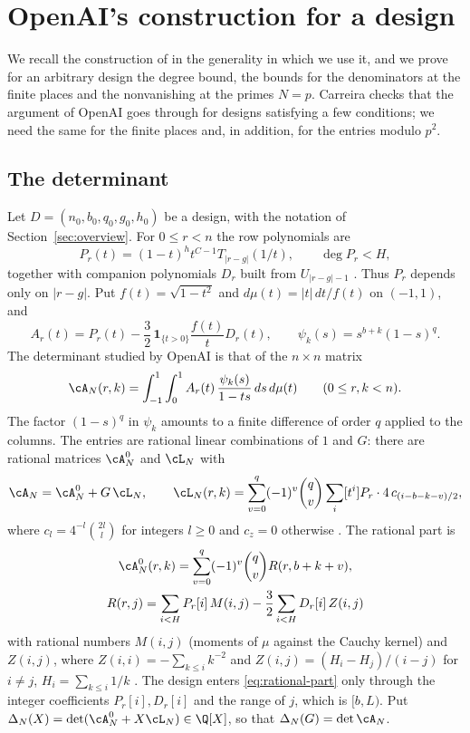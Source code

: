 \section{OpenAI's construction for a design}\label{sec:setup}

We recall the construction of \cite{OpenAI2026} in the generality in which we use it, and we prove for an
arbitrary design the degree bound, the bounds for the denominators at the finite places and the
nonvanishing at the primes $N=p$. Carreira \cite{Carreira2026} checks that the argument of OpenAI goes
through for designs satisfying a few conditions; we need the same for the finite places and, in addition,
for the entries modulo $p^2$.

\subsection{The determinant}
Let $D=(n_0,b_0,q_0,g_0,h_0)$ be a design, with the notation of Section~\ref{sec:overview}. For $0\le r<n$
the row polynomials are
\begin{equation}\label{eq:rows}
 P_r(t)=(1-t)^ht^{C-1}T_{|r-g|}(1/t),\qquad \deg P_r<H,
\end{equation}
together with companion polynomials $D_r$ built from $U_{|r-g|-1}$ \cite[(3)]{OpenAI2026}. Thus
$P_r$ depends only on $|r-g|$. Put $f(t)=\sqrt{1-t^2}$ and $d\mu(t)=|t|\,dt/f(t)$ on $(-1,1)$, and
\[
 A_r(t)=P_r(t)-\frac32\,\mathbf 1_{\{t>0\}}\frac{f(t)}{t}D_r(t),\qquad
 \psi_k(s)=s^{b+k}(1-s)^q .
\]
The determinant studied by OpenAI is that of the $n\times n$ matrix
\begin{equation}\label{eq:matrix}
 \cA_N(r,k)=\int_{-1}^1\int_0^1 A_r(t)\,\frac{\psi_k(s)}{1-ts}\,ds\,d\mu(t)
 \qquad(0\le r,k<n).
\end{equation}
The factor $(1-s)^q$ in $\psi_k$ amounts to a finite difference of order $q$ applied to the columns.
The entries are rational linear combinations of $1$ and $G$: there are rational matrices $\cA^0_N$
and $\cL_N$ with
\begin{equation}\label{eq:L}
 \cA_N=\cA^0_N+G\,\cL_N,\qquad
 \cL_N(r,k)=\sum_{v=0}^{q}(-1)^v\binom qv\sum_{i}[t^i]P_r\cdot4\,c_{(i-b-k-v)/2},
\end{equation}
where $c_l=4^{-l}\binom{2l}{l}$ for integers $l\ge0$ and $c_z=0$ otherwise
\cite[Prop.~2.1 and (20)]{OpenAI2026}. The rational part is
\begin{equation}\label{eq:rational-part}
 \begin{gathered}
 \cA^0_N(r,k)=\sum_{v=0}^q(-1)^v\binom qv R(r,b+k+v),\\
 R(r,j)=\sum_{i<H}P_r[i]\,M(i,j)-\frac32\sum_{i<H}D_r[i]\,Z(i,j)
 \end{gathered}
\end{equation}
with rational numbers $M(i,j)$ (moments of $\mu$ against the Cauchy kernel) and $Z(i,j)$, where
$Z(i,i)=-\sum_{k\le i}k^{-2}$ and $Z(i,j)=(H_i-H_j)/(i-j)$ for $i\ne j$, $H_i=\sum_{k\le i}1/k$
\cite[Prop.~2.1]{OpenAI2026}. The design enters \eqref{eq:rational-part} only through the integer
coefficients $P_r[i],D_r[i]$ and the range of $j$, which is $[b,L)$. Put
$\Delta_N(X)=\det(\cA^0_N+X\cL_N)\in\Q[X]$, so that $\Delta_N(G)=\det\cA_N$.

